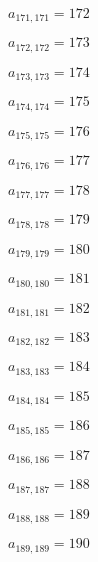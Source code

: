 \documentclass[a4paper,12pt]{article}
\begin{document}
$a _{ 171, 171 } = 172$

$a _{ 172, 172 } = 173$

$a _{ 173, 173 } = 174$

$a _{ 174, 174 } = 175$

$a _{ 175, 175 } = 176$

$a _{ 176, 176 } = 177$

$a _{ 177, 177 } = 178$

$a _{ 178, 178 } = 179$

$a _{ 179, 179 } = 180$

$a _{ 180, 180 } = 181$

$a _{ 181, 181 } = 182$

$a _{ 182, 182 } = 183$

$a _{ 183, 183 } = 184$

$a _{ 184, 184 } = 185$

$a _{ 185, 185 } = 186$

$a _{ 186, 186 } = 187$

$a _{ 187, 187 } = 188$

$a _{ 188, 188 } = 189$

$a _{ 189, 189 } = 190$
\end{document}
